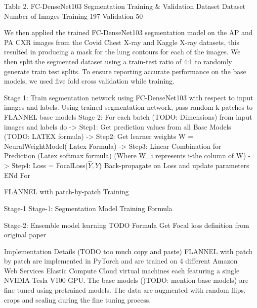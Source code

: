 \documentclass{sigkddExp}
\begin{document}
Table 2. FC-DenseNet103 Segmentation Training \& Validation Dataset Dataset
Number of Images Training 197 Validation 50


We then applied the trained FC-DenseNet103 segmentation model on the AP and PA CXR images from the Covid Chest X-ray and Kaggle X-ray datasets, this resulted in producing a mask for the lung contours for each of the images. We then split the segmented dataset using a train-test ratio of 4:1 to randomly generate train test splits. To ensure reporting accurate performance on the base models, we used five fold cross validation while training.


\begin{algorithm}
    \SetAlgoLined
{}  



Stage 1:
Train segmentation network using FC-DenseNet103 with respect to input images and labels.
Using trained segmentation network, pass random k patches to FLANNEL base models
Stage 2:
For each batch (TODO: Dimensions) from input images and labels do
-> Step1: Get prediction values from all Base Models
(TODO: LATEX formula)
-> Step2: Get learner weights
W = NeuralWeightModel( Latex Formula)
-> Step3: Linear Combination for Prediction
(Latex softmax formula)
(Where W\_i represents i-the column of W)
-> Step4:
Loss = FocalLoss($\hat{Y} , Y$)
Back-propagate on Loss and update parameters
ENd For
\caption{FLANNEL with patch-by-patch Training}
\end{algorithm}

Stage-1
Stage-1: Segmentation Model Training
Formula



Stage-2: Ensemble model learning
TODO Formula
Get Focal loss definition from original paper


Implementation Details
(TODO too much copy and paste)
FLANNEL with patch by patch are implemented in PyTorch and are trained on 4 different Amazon Web Services Elastic Compute Cloud virtual machines each featuring a single NVIDIA Tesla V100 GPU. The base models ()TODO: mention base models) are fine tuned using pretrained models. The data are augmented with random flips, crops and scaling during the fine tuning process.
\end{document}
